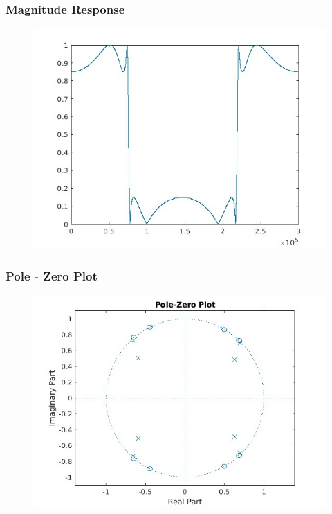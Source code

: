 \documentclass{article}
\begin{document}
\subsubsection{Magnitude Response}
\begin{figure}[H]
\hspace*{-2.5cm}
    \centering
    \includegraphics[width=1.5\linewidth, height=0.65\textheight]{bsf_mag.jpg}
    \label{fig:my_label}
\end{figure}

\subsubsection{Pole - Zero Plot}
\begin{figure}[H]
\hspace*{-2.5cm}
    \centering
    \includegraphics[width=1.5\linewidth, height=0.5\textheight]{pole_zero_bsf.jpg}
    \label{fig:my_label}
\end{figure}
\end{document}
